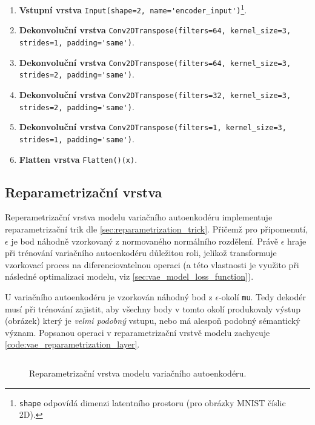 \begin{enumerate}
    \item \textbf{Vstupní vrstva} \lstinline{Input(shape=2, name='encoder_input')}\footnote{\lstinline{shape} odpovídá dimenzi latentního prostoru (pro obrázky MNIST číslic 2D).}.
    \item \textbf{Dekonvoluční vrstva} \lstinline{Conv2DTranspose(filters=64, kernel_size=3, strides=1, padding='same')}.
    \item \textbf{Dekonvoluční vrstva} \lstinline{Conv2DTranspose(filters=64, kernel_size=3, strides=2, padding='same')}.
    \item \textbf{Dekonvoluční vrstva} \lstinline{Conv2DTranspose(filters=32, kernel_size=3, strides=2, padding='same')}.
    \item \textbf{Dekonvoluční vrstva} \lstinline{Conv2DTranspose(filters=1, kernel_size=3, strides=1, padding='same')}.
    \item \textbf{Flatten vrstva} \lstinline{Flatten()(x)}.
\end{enumerate}

\subsection{Reparametrizační vrstva}
\label{sec:vae_model_reparametrization_layer}
Reperametrizační vrstva modelu variačního autoenkodéru implementuje reparametrizační trik dle \autoref{sec:reparametrization_trick}.
Přičemž pro připomenutí, $\epsilon$ je bod náhodně vzorkovaný z normovaného normálního rozdělení.
Právě $\epsilon$ hraje při trénování variačního autoenkodéru důležitou roli, jelikož transformuje vzorkovací proces na diferenciovatelnou operaci (a této vlastnosti je využito při následné optimalizaci modelu, viz \autoref{sec:vae_model_loss_function}).


U variačního autoenkodéru je vzorkován náhodný bod z $\epsilon$-okolí \lstinline{mu}.
Tedy dekodér musí při trénování zajistit, aby všechny body v tomto okolí produkovaly výstup (obrázek) který je \emph{velmi podobný} vstupu, nebo má alespoň podobný sémantický význam.
Popsanou operaci v reparametrizační vrstvě modelu zachycuje \autoref{code:vae_reparametrization_layer}.

\begin{figure}[H]
    \inputminted[linenos]{python}{code_snippets/vae_reparametrization.py}
    \caption{Reparametrizační vrstva modelu variačního autoenkodéru.}
    \label{code:vae_reparametrization_layer}
\end{figure}


